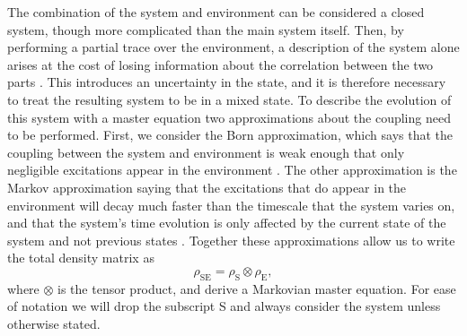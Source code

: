 The combination of the system and environment can be considered a closed system, though more complicated than the main system itself. Then, by performing a partial trace over the environment, a description of the system alone arises at the cost of losing information about the correlation between the two parts \cite{Annby-Andersson:2024}. This introduces an uncertainty in the state, and it is therefore necessary to treat the resulting system to be in a mixed state. To describe the evolution of this system with a master equation two approximations about the coupling need to be performed. First, we consider the Born approximation, which says that the coupling between the system and environment is weak enough that only negligible excitations appear in the environment \cite{Breuer:2007}. The other approximation is the Markov approximation saying that the excitations that do appear in the environment will decay much faster than the timescale that the system varies on, and that the system's time evolution is only affected by the current state of the system and not previous states \cite{Breuer:2007}. Together these approximations allow us to write the total density matrix as 
\begin{equation}
    \rho_\mathrm{SE} = \rho_\mathrm{S} \otimes \rho_\mathrm{E},
\end{equation}
where $\otimes$ is the tensor product, and derive a Markovian master equation. For ease of notation we will drop the subscript S and always consider the system unless otherwise stated.

